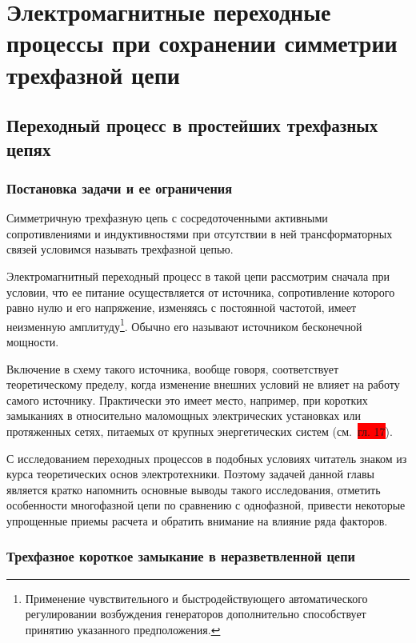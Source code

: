 \part{Электромагнитные переходные процессы при сохранении симметрии трехфазной цепи}

\chapter{Переходный процесс в простейших трехфазных цепях}
\label{chap:3}

\section{Постановка задачи и ее ограничения}
\label{sec:3-1}

Симметричную трехфазную цепь с сосредоточенными активными сопротивлениями и индуктивностями при отсутствии в ней трансформаторных связей условимся называть  трехфазной цепью.

Электромагнитный переходный процесс в такой цепи рассмотрим сначала при условии, что ее питание осуществляется от источника, сопротивление которого равно нулю и его напряжение, изменяясь с постоянной частотой, имеет неизменную амплитуду\footnote{Применение чувствительного и быстродействующего автоматического регулировании возбуждения генераторов дополнительно способствует принятию указанного предположения.}. Обычно его называют источником бесконечной  мощности.

Включение в схему такого источника, вообще говоря, соответствует теоретическому пределу, когда изменение внешних условий не влияет на работу самого источнику. Практически это имеет место, например, при коротких замыканиях в относительно маломощных электрических установках или протяженных сетях, питаемых от крупных энергетических систем (см.~\colorbox{red}{гл. 17}).

С исследованием переходных процессов в подобных условиях читатель знаком из курса теоретических основ электротехники. Поэтому задачей данной главы является кратко напомнить основные выводы такого исследования, отметить особенности многофазной цепи по сравнению с однофазной, привести некоторые упрощенные приемы расчета и обратить внимание на влияние ряда факторов.

\section{Трехфазное короткое замыкание в неразветвленной цепи}
\label{sec:3-2}

